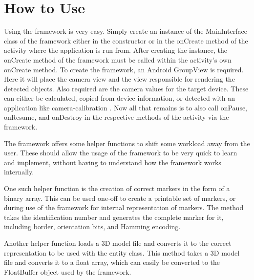 \section{How to Use}

Using the framework is very easy.
Simply create an instance of the MainInterface class of the framework either in the constructor or in the onCreate method of the activity where the application is run from.
After creating the instance, the onCreate method of the framework must be called within the activity's own onCreate method.
To create the framework, an Android GroupView is required.
Here it will place the camera view and the view responsible for rendering the detected objects. Also required are the camera values for the target device.
These can either be calculated, copied from device information, or detected with an application like camera-calibration \cite{calib}.
Now all that remains is to also call onPause, onResume, and onDestroy in the respective methods of the activity via the framework.

The framework offers some helper functions to shift some workload away from the user.
These should allow the usage of the framework to be very quick to learn and implement, without having to understand how the framework works internally.

One such helper function is the creation of correct markers in the form of a binary array.
This can be used one-off to create a printable set of markers, or during use of the framework for internal representation of markers.
The method takes the identification number and generates the complete marker for it, including border, orientation bits, and Hamming encoding.

Another helper function loads a 3D model file and converts it to the correct representation to be used with the entity class.
This method takes a 3D model file and converts it to a float array, which can easily be converted to the FloatBuffer object used by the framework.
